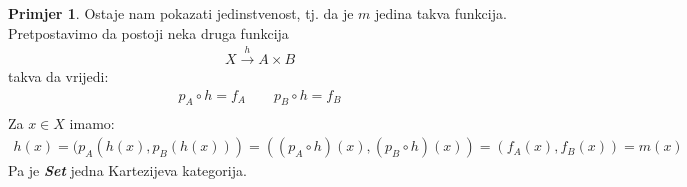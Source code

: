 \documentclass[11pt]{article}
\newcommand{\category}[1]{\textbf{\emph{#1}}}
\theoremstyle{definition}
\newtheorem{primjer}{Primjer}
\begin{document}
\begin{primjer}
  Ostaje nam pokazati jedinstvenost, tj. da je $m$ jedina takva funkcija.
  Pretpostavimo da postoji neka druga funkcija
  \begin{align*}
    X \xrightarrow{h} A \times B
  \end{align*}
  takva da  vrijedi:
  \begin{align*}
    p_A \circ h = f_A \qquad p_B \circ h = f_B\\
  \end{align*}
  Za $x \in X$ imamo:
  \begin{align*}
    h(x) = (p_A(h(x), p_B(h(x))) = ((p_A \circ h )(x), (p_B \circ h)(x)) =
    (f_A(x), f_B(x)) = m(x)
  \end{align*}
  Pa je \category{Set} jedna Kartezijeva kategorija.
  \end{primjer}
  \newpage

\end{document}
